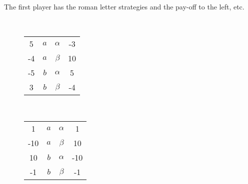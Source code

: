 The first player has the roman letter strategies and the pay-off to the left, etc.
\begin{example}
    \,
                \begin{figure}[htbp]
  \begin{minipage}[c]{0.25\linewidth}
      \!\!\!
    \begin{tabular}{cccc}
        5 &   $a$ &  $\alpha $ & -3 \\
        -4 & $a$ & $\beta $ & 10\\
        -5 & $b$ & $\alpha $ &5\\
        3 & $b$ & $\beta $ &-4
    \end{tabular}
  \end{minipage}
  \begin{minipage}[c]{0.65\linewidth}
      \centering{}\vspace{0.2cm}\newline{}
  \end{minipage}
\end{figure}
\end{example}
\begin{example}
    \,
                \begin{figure}[htbp]
  \begin{minipage}[c]{0.25\linewidth}
      \!\!\!
    \begin{tabular}{cccc}
        1 &   $a$ &  $\alpha $ & 1 \\
        -10 & $a$ & $\beta $ & 10\\
       10 & $b$ & $\alpha $ &-10\\
        -1 & $b$ & $\beta $ &-1
    \end{tabular}
  \end{minipage}
  \begin{minipage}[c]{0.65\linewidth}
     \centering {}\vspace{0.2cm}\newline{}
  \end{minipage}
\end{figure}
\end{example}
